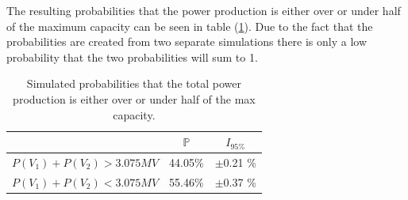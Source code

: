 \documentclass[a4paper]{article}
\begin{document}
The resulting probabilities that the power production is either over or under half of the maximum capacity can be seen in table (\ref{table:probabilities}). Due to the fact that the probabilities are created from two separate simulations there is only a low probability that the two probabilities will sum to 1. 


\begin{table}[H]
    \centering
    \caption{Simulated probabilities that the total power production is either over or under half of the max capacity.}
    \begin{tabular}{lcc}
        \toprule
        & $\mathbb{P}$ & $I_{95\%}$ \\
        \midrule
        $P(V_1) + P(V_2) > 3.075MV$ & 44.05\% & $\pm$0.21 \% \\
        $P(V_1) + P(V_2) < 3.075MV$ & 55.46\% & $\pm$0.37 \% \\
        \bottomrule
    \end{tabular}
    \label{table:probabilities}
\end{table}
    
\end{document}
